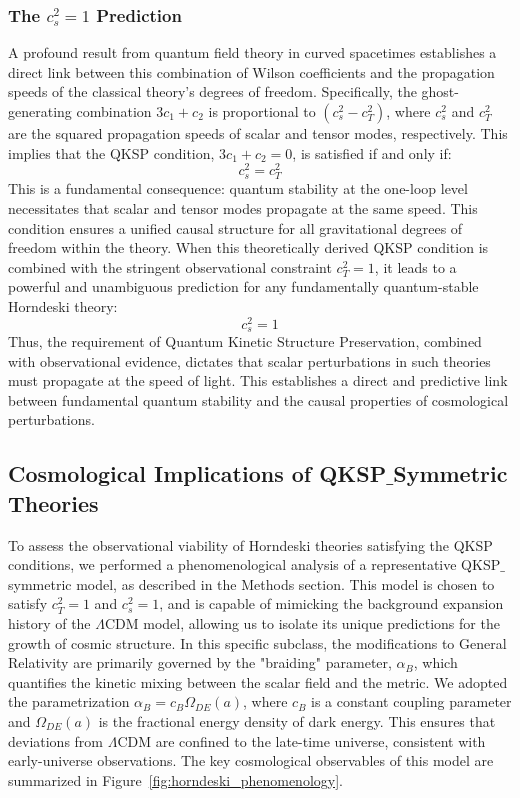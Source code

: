 \documentclass[twocolumn]{aastex631}
\begin{document}
\subsubsection{The $c_s^2=1$ Prediction}
A profound result from quantum field theory in curved spacetimes establishes a direct link between this combination of Wilson coefficients and the propagation speeds of the classical theory's degrees of freedom. Specifically, the ghost-generating combination $3c_1 + c_2$ is proportional to $(c_s^2 - c_T^2)$, where $c_s^2$ and $c_T^2$ are the squared propagation speeds of scalar and tensor modes, respectively. This implies that the QKSP condition, $3c_1 + c_2 = 0$, is satisfied if and only if:
$$c_s^2 = c_T^2$$
This is a fundamental consequence: quantum stability at the one-loop level necessitates that scalar and tensor modes propagate at the same speed. This condition ensures a unified causal structure for all gravitational degrees of freedom within the theory. When this theoretically derived QKSP condition is combined with the stringent observational constraint $c_T^2=1$, it leads to a powerful and unambiguous prediction for any fundamentally quantum-stable Horndeski theory:
$$c_s^2 = 1$$
Thus, the requirement of Quantum Kinetic Structure Preservation, combined with observational evidence, dictates that scalar perturbations in such theories must propagate at the speed of light. This establishes a direct and predictive link between fundamental quantum stability and the causal properties of cosmological perturbations.

\subsection{Cosmological Implications of QKSP\ensuremath{\_}Symmetric Theories}

To assess the observational viability of Horndeski theories satisfying the QKSP conditions, we performed a phenomenological analysis of a representative QKSP\ensuremath{\_}symmetric model, as described in the Methods section. This model is chosen to satisfy $c_T^2=1$ and $c_s^2=1$, and is capable of mimicking the background expansion history of the $\Lambda$CDM model, allowing us to isolate its unique predictions for the growth of cosmic structure. In this specific subclass, the modifications to General Relativity are primarily governed by the "braiding" parameter, $\alpha_B$, which quantifies the kinetic mixing between the scalar field and the metric. We adopted the parametrization $\alpha_B = c_B \Omega_{DE}(a)$, where $c_B$ is a constant coupling parameter and $\Omega_{DE}(a)$ is the fractional energy density of dark energy. This ensures that deviations from $\Lambda$CDM are confined to the late-time universe, consistent with early-universe observations. The key cosmological observables of this model are summarized in \mbox{Figure \ref{fig:horndeski_phenomenology}}.
\end{document}
